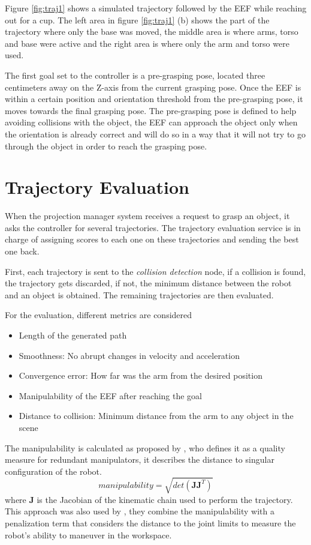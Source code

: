 Figure \ref{fig:traj1} shows a simulated trajectory followed by the EEF while reaching out for a cup. The left area in figure \ref{fig:traj1} (b) shows the part of the trajectory where only the base was moved, the middle area is where arms, torso and base were active and the right area is where only the arm and torso were used.

The first goal set to the controller is a pre-grasping pose, located three centimeters away on the Z-axis from the current grasping pose. Once the EEF is within a certain position and orientation threshold from the  pre-grasping pose, it moves towards the final grasping pose. The pre-grasping pose is defined to help avoiding collisions with the object, the EEF can approach the object only when the orientation is already correct and will do so in a way that it will not try to go through the object in order to reach the grasping pose.

\section{Trajectory Evaluation}
\label{sec:traj_eval}

When the projection manager system receives a request to grasp an object, it asks the controller for several trajectories. The trajectory evaluation service is in charge of assigning scores to each one on these trajectories and sending the best one back.

First, each trajectory is sent to the \textit{collision detection} node, if a collision is found, the trajectory gets discarded, if not, the minimum distance between the robot and an object is obtained. The remaining trajectories are then evaluated.

For the evaluation, different metrics are considered
\begin{itemize}
	\item Length of the generated path
	\item Smoothness: No abrupt changes in velocity and acceleration
	\item Convergence error: How far was the arm from the desired position
	\item Manipulability of the EEF after reaching the goal
	\item Distance to collision: Minimum distance from the arm to any object in the scene
\end{itemize}


The manipulability is calculated as proposed by \cite{Yoshikawa}, who defines it as a quality measure for redundant manipulators, it describes the distance to singular configuration of the robot.
$$
manipulability = \sqrt{det(\textbf{JJ}^{T})}
$$
where $\textbf{J}$ is the Jacobian of the kinematic chain used to perform the trajectory. This approach was also used by \cite{manip_analysis}, they combine the manipulability with a penalization term that considers the distance to the joint limits to measure the robot's ability to maneuver in the workspace.

